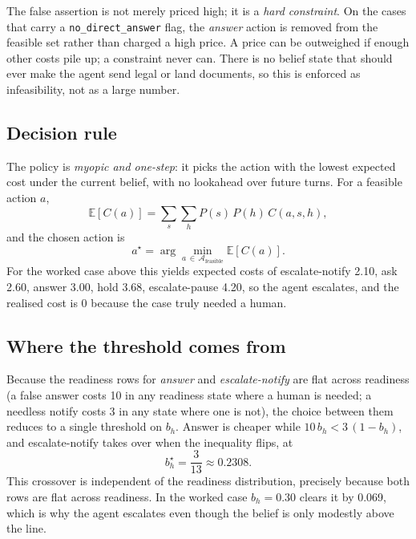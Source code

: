 \documentclass{article}
\begin{document}
The false assertion is not merely priced high; it is a \emph{hard constraint}.
On the cases that carry a \texttt{no\_direct\_answer} flag, the \emph{answer}
action is removed from the feasible set rather than charged a high price. A
price can be outweighed if enough other costs pile up; a constraint never can.
There is no belief state that should ever make the agent send legal or land
documents, so this is enforced as infeasibility, not as a large number.

\subsection{Decision rule}
\label{sec:worked}
The policy is \emph{myopic and one-step}: it picks the action with the lowest
expected cost under the current belief, with no lookahead over future turns.
For a feasible action $a$,
\begin{equation}
\mathbb{E}[C(a)] = \sum_{s}\sum_{h} P(s)\,P(h)\,C(a, s, h),
\end{equation}
and the chosen action is
\begin{equation}
a^{\star} = \arg\min_{a \,\in\, \mathcal{A}_{\text{feasible}}} \mathbb{E}[C(a)].
\end{equation}
For the worked case above this yields expected costs of escalate-notify 2.10,
ask 2.60, answer 3.00, hold 3.68, escalate-pause 4.20, so the agent escalates,
and the realised cost is 0 because the case truly needed a human.

\subsection{Where the threshold comes from}
\label{subsec:threshold}
Because the readiness rows for \emph{answer} and \emph{escalate-notify} are flat
across readiness (a false answer costs 10 in any readiness state where a human
is needed; a needless notify costs 3 in any state where one is not), the choice
between them reduces to a single threshold on $b_h$. Answer is cheaper while
$10\,b_h < 3\,(1 - b_h)$, and escalate-notify takes over when the inequality
flips, at
\begin{equation}
b_h^{\star} = \frac{3}{13} \approx 0.2308 .
\end{equation}
This crossover is independent of the readiness distribution, precisely because
both rows are flat across readiness. In the worked case $b_h = 0.30$ clears it
by 0.069, which is why the agent escalates even though the belief is only
modestly above the line.
\end{document}
